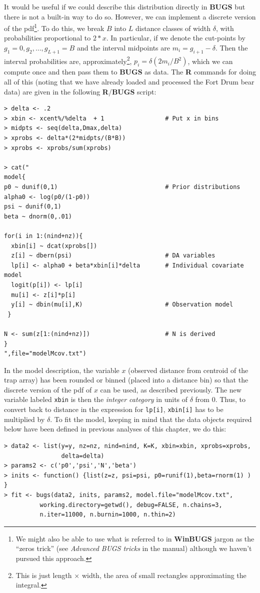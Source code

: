 It would be useful if we could describe this distribution directly in
{\bf BUGS} but there is not a built-in way to do so. However, we can
implement a discrete version of the pdf\footnote{We might also be able
  to use what is referred to in {\bf WinBUGS} jargon as the ``zeros
  trick'' (see {\it Advanced BUGS tricks} in the manual) although we
  haven't pursued this approach.}. To do this, we break $B$ into $L$
distance classes of width $\delta$, with probabilities proportional to
$2*x$. In particular, if we denote the cut-points by $g_{1}=0,g_{2},
\ldots, g_{L+1}=B$ and the interval midpoints are $m_{i} =
g_{i+1}-\delta$.  Then the interval probabilities are,
approximately\footnote{This is just length $\times$ width, the area of
  small rectangles approximating the integral.}, $p_{i} = \delta (2
m_{i} /B^{2})$, which we can compute once and then pass them to {\bf
  BUGS} as data.  The {\bf R} commands for doing all of this (noting
that we have already loaded and processed the Fort Drum bear data) are
given in the following {\bf R}/{\bf BUGS} script: 
{\small
\begin{verbatim}
> delta <- .2
> xbin <- xcent%/%delta  + 1                 # Put x in bins
> midpts <- seq(delta,Dmax,delta)
> xprobs <- delta*(2*midpts/(B*B))
> xprobs <- xprobs/sum(xprobs)

> cat("
model{
p0 ~ dunif(0,1)                              # Prior distributions
alpha0 <- log(p0/(1-p0))
psi ~ dunif(0,1)
beta ~ dnorm(0,.01)

for(i in 1:(nind+nz)){
  xbin[i] ~ dcat(xprobs[])
  z[i] ~ dbern(psi)                          # DA variables
  lp[i] <- alpha0 + beta*xbin[i]*delta       # Individual covariate model
  logit(p[i]) <- lp[i]
  mu[i] <- z[i]*p[i]
  y[i] ~ dbin(mu[i],K)                       # Observation model
 }

N <- sum(z[1:(nind+nz)])                     # N is derived
}
",file="modelMcov.txt")
\end{verbatim}
}
In the model description, the variable $x$ (observed distance
from centroid of the trap array) has been rounded or binned (placed
into a distance bin) so that the discrete
version of the pdf of $x$ can be used, as described previously. The new
variable labeled \mbox{\tt xbin} is then the {\it integer category}
in units of $\delta$ from 0. Thus, to convert back to distance in the
expression for \mbox{\tt lp[i]}, \mbox{\tt xbin[i]} has to be multiplied by
$\delta$.
To fit the model, keeping in mind that the data objects
required below have been defined in previous analyses of this chapter,
we do this:
{\small
\begin{verbatim}
> data2 <- list(y=y, nz=nz, nind=nind, K=K, xbin=xbin, xprobs=xprobs,
                delta=delta)
> params2 <- c('p0','psi','N','beta')
> inits <- function() {list(z=z, psi=psi, p0=runif(1),beta=rnorm(1) ) }
> fit <- bugs(data2, inits, params2, model.file="modelMcov.txt",
          working.directory=getwd(), debug=FALSE, n.chains=3, 
          n.iter=11000, n.burnin=1000, n.thin=2)
\end{verbatim}
}

